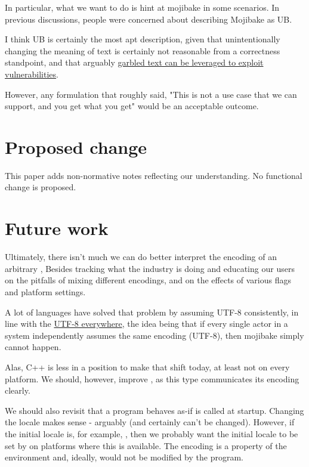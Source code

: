 \documentclass{wg21}
\begin{document}
In particular, what we want to do is hint at mojibake in some scenarios.
In previous discussions, people were concerned about describing Mojibake as UB.

I think UB is certainly the most apt description, given that unintentionally changing the meaning of text
is certainly not reasonable from a correctness standpoint, and that arguably \href{https://worst.fit/}{garbled text can be leveraged
to exploit vulnerabilities}.

However, any formulation that roughly said, "This is not a use case that we can support, and you get what you get" would be an acceptable
outcome.

\section{Proposed change}

This paper adds non-normative notes reflecting our understanding.
No functional change is proposed.

\section{Future work}

Ultimately, there isn't much we can do better interpret the encoding of an arbitrary ,
Besides tracking what the industry is doing and educating our users on the pitfalls of mixing different encodings,
and on the effects of various flags and platform settings.

A lot of languages have solved that problem by assuming UTF-8 consistently, in line with the \href{https://utf8everywhere.org/}{UTF-8 everywhere}, the idea being that if every single actor in a system independently assumes the same encoding (UTF-8), then mojibake simply cannot happen.

Alas, C++ is less in a position to make that shift today, at least not on every platform. We should, however, improve , as this type communicates its encoding clearly.

We should also revisit that a program behaves as-if  is called at startup.
Changing the locale makes sense - arguably (and certainly can't be changed).
However, if the initial locale is, for example, , then we probably want the initial locale to be
set by  on platforms where this is available.
The encoding is a property of the environment and, ideally, would not be modified by the program.
\end{document}

